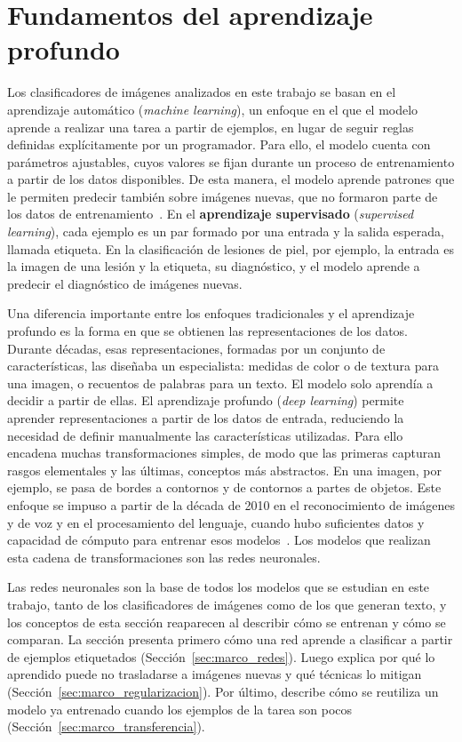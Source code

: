 \section{Fundamentos del aprendizaje profundo}
\label{sec:marco_fundamentos}

Los clasificadores de imágenes analizados en este trabajo se basan en el aprendizaje automático
(\emph{machine learning}), un enfoque en el que el modelo aprende a realizar una tarea a partir de ejemplos, en
lugar de seguir reglas definidas explícitamente por un programador. Para ello, el modelo cuenta con parámetros
ajustables, cuyos valores se fijan durante un proceso de entrenamiento a partir de los datos disponibles. De esta
manera, el modelo aprende patrones que le permiten predecir también sobre imágenes nuevas, que no formaron parte
de los datos de entrenamiento~\cite{goodfellow2016deep}. En el \textbf{aprendizaje supervisado} (\emph{supervised learning}), cada
ejemplo es un par formado por una entrada y la salida esperada, llamada etiqueta. En la clasificación de
lesiones de piel, por ejemplo, la entrada es la imagen de una lesión y la etiqueta, su diagnóstico, y el modelo
aprende a predecir el diagnóstico de imágenes nuevas.

Una diferencia importante entre los enfoques tradicionales y el aprendizaje profundo es la forma en que se obtienen las representaciones de los datos. Durante
décadas, esas representaciones, formadas por un conjunto de características, las diseñaba un especialista: medidas de
color o de textura para una imagen, o recuentos de palabras para un texto. El modelo solo aprendía a decidir a
partir de ellas. El aprendizaje profundo (\emph{deep learning}) permite aprender representaciones a partir de los datos de entrada, reduciendo la necesidad de definir manualmente las características utilizadas. Para ello encadena muchas transformaciones simples, de modo que
las primeras capturan rasgos elementales y las últimas, conceptos más abstractos. En una imagen, por ejemplo, se
pasa de bordes a contornos y de contornos a partes de objetos. Este enfoque se impuso a partir de la década de
2010 en el reconocimiento de imágenes y de voz y en el procesamiento del lenguaje, cuando hubo suficientes datos
y capacidad de cómputo para entrenar esos modelos~\cite{goodfellow2016deep}. Los modelos que realizan esta
cadena de transformaciones son las redes neuronales.

Las redes neuronales son la base de todos los modelos que se estudian en este trabajo, tanto de los
clasificadores de imágenes como de los que generan texto, y los conceptos de esta sección reaparecen al describir
cómo se entrenan y cómo se comparan. La sección presenta primero cómo una red aprende a clasificar a partir de
ejemplos etiquetados (Sección~\ref{sec:marco_redes}). Luego explica por qué lo aprendido puede no trasladarse a
imágenes nuevas y qué técnicas lo mitigan (Sección~\ref{sec:marco_regularizacion}). Por último, describe cómo se
reutiliza un modelo ya entrenado cuando los ejemplos de la tarea son pocos (Sección~\ref{sec:marco_transferencia}).

